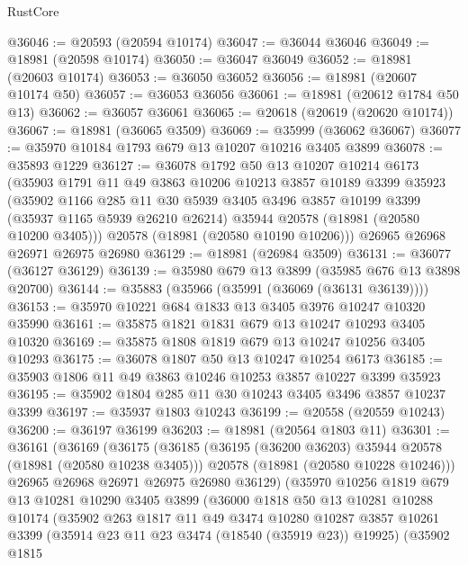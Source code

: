 \begin{lexlean}{RustCore}
\begin{coremodule}
@36046 := @20593 (@20594 @10174)
@36047 := @36044 @36046
@36049 := @18981 (@20598 @10174)
@36050 := @36047 @36049
@36052 := @18981 (@20603 @10174)
@36053 := @36050 @36052
@36056 := @18981 (@20607 @10174 @50)
@36057 := @36053 @36056
@36061 := @18981 (@20612 @1784 @50 @13)
@36062 := @36057 @36061
@36065 := @20618 (@20619 (@20620 @10174))
@36067 := @18981 (@36065 @3509)
@36069 := @35999 (@36062 @36067)
@36077 := @35970 @10184 @1793 @679 @13 @10207 @10216 @3405 @3899
@36078 := @35893 @1229
@36127 := @36078
    @1792
    @50
    @13
    @10207
    @10214
    @6173
    (@35903
      @1791
      @11
      @49
      @3863
      @10206
      @10213
      @3857
      @10189
      @3399
      @35923
      (@35902
        @1166
        @285
        @11
        @30
        @5939
        @3405
        @3496
        @3857
        @10199
        @3399
        (@35937 @1165 @5939 @26210 @26214)
        @35944
        @20578
        (@18981 (@20580 @10200 @3405)))
      @20578
      (@18981 (@20580 @10190 @10206)))
    @26965
    @26968
    @26971
    @26975
    @26980
@36129 := @18981 (@26984 @3509)
@36131 := @36077 (@36127 @36129)
@36139 := @35980 @679 @13 @3899 (@35985 @676 @13 @3898 @20700)
@36144 := @35883 (@35966 (@35991 (@36069 (@36131 @36139))))
@36153 := @35970 @10221 @684 @1833 @13 @3405 @3976 @10247 @10320 @35990
@36161 := @35875 @1821 @1831 @679 @13 @10247 @10293 @3405 @10320
@36169 := @35875 @1808 @1819 @679 @13 @10247 @10256 @3405 @10293
@36175 := @36078 @1807 @50 @13 @10247 @10254 @6173
@36185 := @35903 @1806 @11 @49 @3863 @10246 @10253 @3857 @10227 @3399 @35923
@36195 := @35902 @1804 @285 @11 @30 @10243 @3405 @3496 @3857 @10237 @3399
@36197 := @35937 @1803 @10243
@36199 := @20558 (@20559 @10243)
@36200 := @36197 @36199
@36203 := @18981 (@20564 @1803 @11)
@36301 := @36161
    (@36169
      (@36175
        (@36185
          (@36195 (@36200 @36203) @35944 @20578 (@18981 (@20580 @10238 @3405)))
          @20578
          (@18981 (@20580 @10228 @10246)))
        @26965
        @26968
        @26971
        @26975
        @26980
        @36129)
      (@35970
        @10256
        @1819
        @679
        @13
        @10281
        @10290
        @3405
        @3899
        (@36000
          @1818
          @50
          @13
          @10281
          @10288
          @10174
          (@35902
            @263
            @1817
            @11
            @49
            @3474
            @10280
            @10287
            @3857
            @10261
            @3399
            (@35914 @23 @11 @23 @3474 (@18540 (@35919 @23)) @19925)
            (@35902
              @1815

\end{coremodule}
\end{lexlean}
